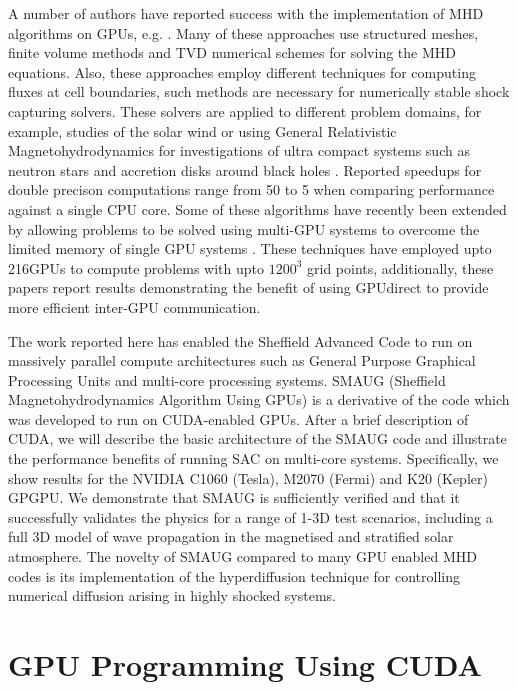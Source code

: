 \documentclass[final,1p]{elsarticle}
\begin{document}
A number of authors have reported success with the implementation of MHD algorithms on GPUs, e.g.  \cite{Schive2011, Kestener2012, Pang2010, Lin2011, Wong2011}. Many of these approaches use structured meshes, finite volume methods and TVD numerical schemes for solving the MHD equations. Also, these approaches employ different techniques for computing fluxes at cell boundaries,  such methods are necessary for numerically stable shock capturing solvers. These solvers are applied to different problem domains, for example, studies of the solar wind or using General Relativistic Magnetohydrodynamics for investigations of ultra compact systems such as neutron stars and accretion disks around black holes \cite{Zink2011}. Reported speedups for double precison computations range from 50 to 5 when comparing performance against a single CPU core. Some of these algorithms have recently been extended by allowing problems to be solved using multi-GPU systems to  overcome the limited memory of single GPU systems \cite{Wong2014A, Wong2014B}. These techniques have employed upto 216GPUs to compute problems with upto $1200^{3}$ grid points, additionally, these papers report results demonstrating the benefit of using GPUdirect to provide more efficient inter-GPU communication.

The work reported here has enabled the Sheffield Advanced Code to run on massively parallel compute architectures such as General Purpose Graphical Processing Units and multi-core processing systems.  SMAUG (Sheffield Magnetohydrodynamics Algorithm Using GPUs) is a derivative of the code which was developed to run on CUDA-enabled GPUs.  After a brief description of CUDA, we will describe the basic architecture of the SMAUG code and illustrate the performance benefits of running SAC on multi-core systems. Specifically, we show results for the NVIDIA C1060 (Tesla), M2070 (Fermi) and K20 (Kepler) GPGPU. We demonstrate that SMAUG is sufficiently verified and that it successfully validates the physics for a range of 1-3D test scenarios, including a full 3D model of wave propagation in the magnetised and stratified solar atmosphere. The novelty of SMAUG compared to many GPU enabled MHD codes is its implementation of the hyperdiffusion technique for controlling numerical diffusion arising in highly shocked systems.


\section{GPU Programming Using CUDA}
\end{document}
